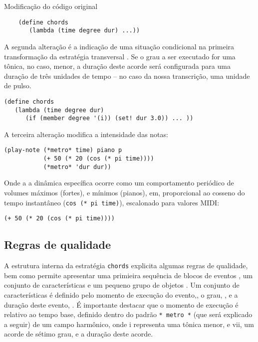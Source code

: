 \begin{example}{Modificação do código original}
\begin{verbatim}
    (define chords
       (lambda (time degree dur) ...))
\end{verbatim}


A segunda alteração é a indicação de uma situação condicional na primeira transformação da estratégia transversal . Se o grau a ser executado for uma tônica, no caso, menor, a duração deste acorde será configurada para uma duração de três unidades de tempo -- no caso da nossa transcrição, uma unidade de pulso.

\begin{verbatim}
(define chords
   (lambda (time degree dur)
      (if (member degree '(i)) (set! dur 3.0)) ... ))
\end{verbatim}

A terceira alteração modifica a intensidade das notas:

\begin{verbatim}
(play-note (*metro* time) piano p
           (+ 50 (* 20 (cos (* pi time))))
           (*metro* 'dur dur))
\end{verbatim}

Onde a a dinâmica específica ocorre como um comportamento periódico de volumes máximos (fortes), e mínimos (pianos), em, proporcional ao cosseno do tempo instantâneo (\verb|cos (* pi time)|), escalonado para valores MIDI:

\begin{verbatim}
(+ 50 (* 20 (cos (* pi time))))
\end{verbatim}
\end{example}

\subsection{Regras de qualidade}\label{sec:regras_qualidade}

A estrutura interna da estratégia \verb|chords| explicita algumas regras de qualidade, bem como permite apresentar uma primieira sequência de blocos de eventos , um conjunto de características  e um pequeno grupo de objetos . Um conjunto de características é definido pelo momento de execução do evento,, o grau, , e a duração deste evento, . É importante destacar que o momento de execução é relativo ao tempo base, definido dentro do padrão \verb|* metro *| (que será explicado a seguir) de um campo harmônico, onde i representa uma tônica menor, e vii, um acorde de sétimo grau, e a duração deste acorde.

